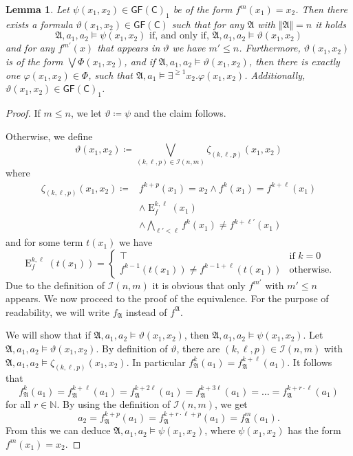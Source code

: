 \documentclass[a4paper,11pt,DIV=15]{scrartcl} %
\renewcommand{\phi}{\varphi}
\theoremstyle{plain}
\newtheorem{lemma}[theorem]{Lemma}
\theoremstyle{definition}
\newcommand{\GFC}{\mathsf{GF}(\mathsf{C})}
\renewcommand{\theta}{\vartheta}
\begin{document}
\begin{lemma}
	Let $\psi(x_1,x_2)\in \GFC_1$ be of the form $f^m(x_1)=x_2$. 
	Then there exists a formula $\theta(x_1,x_2)\in \GFC$ such that for any $\mathfrak A$ with $\Vert \mathfrak A\Vert=n$ it holds
	$$\mathfrak A,a_1,a_2 \models \psi(x_1,x_2) \text{ if, and only if, } \mathfrak A,a_1,a_2 \models \theta(x_1,x_2)$$ 
	and for any $f^{m'}(x)$ that appears in $\theta$ we have $m'\leq n$.
	Furthermore, $\theta(x_1,x_2)$ is of the form $\bigvee \Phi(x_1,x_2)$, and if $\mathfrak A,a_1,a_2\models \theta(x_1,x_2)$, then there is exactly one $\phi(x_1,x_2)\in\Phi$, such that $\mathfrak A,a_1\models \exists^{\geq 1} x_2 . \phi(x_1,x_2)$.
	Additionally, $\theta(x_1,x_2)\in \GFC_1$.
	\label{Simple_fm_to_fk}
\end{lemma}
\begin{proof}
	If $m \leq n$, we let $\theta\coloneqq\psi$ and the claim follows.
	
	Otherwise, we define
	$$\theta(x_1,x_2)\coloneqq \bigvee_{(k,\ell,p)\in \mathcal I(n,m)} \zeta_{(k,\ell,p)}(x_1,x_2)$$
	where
	\begin{align*}
		\zeta_{(k,\ell,p)}(x_1,x_2)\coloneqq & f^{k+p}(x_1)=x_2 \land f^{k}(x_1)=f^{k+\ell}(x_1) \\
		& \land \operatorname{E}^{k,\ell}_{f}(x_1)  \\
		& \land \bigwedge_{\ell'<\ell}f^{k}(x_1)\neq f^{k+\ell'}(x_1)
	\end{align*}
	and for some term $t(x_1)$ we have
	$$\operatorname{E}^{k,\ell}_{f}(t(x_1))=\begin{cases}
		\top & \text{if } k=0 \\
		f^{k-1}(t(x_1))\neq f^{k-1+\ell}(t(x_1)) & \text{otherwise}.
	\end{cases}$$
	Due to the definition of $\mathcal I(n,m)$ it is obvious that only $f^{m'}$ with $m'\leq n$ appears.
	We now proceed to the proof of the equivalence.
	For the purpose of readability, we will write $f_{\mathfrak A}$ instead of $f^{\mathfrak A}$.
	
	We will show that if $\mathfrak A,a_1,a_2 \models \theta(x_1,x_2)$, then $\mathfrak A,a_1,a_2 \models \psi(x_1,x_2)$.
	Let $\mathfrak A,a_1,a_2 \models \theta(x_1,x_2)$. 
	By definition of $\theta$, there are $(k,\ell,p)\in \mathcal I(n,m)$ with $\mathfrak A,a_1,a_2 \models \zeta_{(k,\ell,p)}(x_1,x_2)$.
	In particular $f_{\mathfrak A}^{k}(a_1)=f_{\mathfrak A}^{k+\ell}(a_1)$. It follows that
	$$f_{\mathfrak A}^{k}(a_1)=f_{\mathfrak A}^{k+\ell}(a_1)=f_{\mathfrak A}^{k+2\ell}(a_1)=f_{\mathfrak A}^{k+3\ell}(a_1) = \dots = f_{\mathfrak A}^{k+r\cdot \ell}(a_1)$$
	for all $r\in \mathbb N$. By using the definition of $\mathcal{I}(n,m)$, we get
	$$a_2 =f_{\mathfrak A}^{k+p}(a_1) = f_{\mathfrak A}^{k+r\cdot \ell + p}(a_1)=f_{\mathfrak A}^{m}(a_1).$$
	From this we can deduce $\mathfrak A,a_1,a_2\models \psi(x_1,x_2)$, where $\psi(x_1,x_2)$ has the form $f^{m}(x_1)=x_2$.
	

\end{proof}
\end{document}
